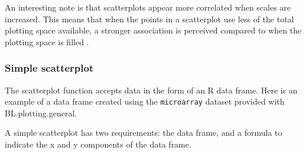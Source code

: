 \documentclass[letterpaper]{report}\usepackage[]{graphicx}\usepackage[]{color}
\begin{document}
An interesting note is that scatterplots appear more correlated when scales are increased. This means that when the points in a scatterplot use less of the total plotting space available, a stronger association is perceived compared to when the plotting space is filled \cite{cleveland-scatter}.

\subsubsection{Simple scatterplot}
The scatterplot function accepts data in the form of an R  data frame. Here is an example of a data frame created using the \verb|microarray| dataset provided with BL.plotting.general.

A simple scatterplot has two requirements: the data frame, and a formula to indicate the x and y components of the data frame.

\end{document}
